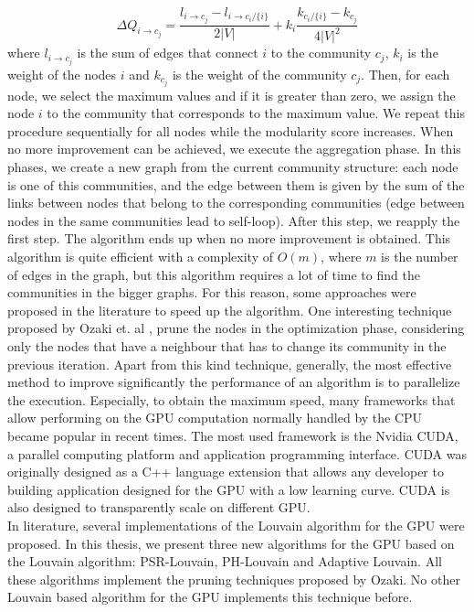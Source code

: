 \begin{equation}\label{intro_Delta}
\Delta Q_{i \rightarrow c_j} = \frac{l_{i\rightarrow c_j} - l_{i\rightarrow c_i / \{i\}}}{2|V|} + k_i \frac{k_{c_i / \{i\}} - k_{c_j}}{4|V|^2}
\end{equation}
where $l_{i\rightarrow c_j}$ is the sum of edges that connect $i$ to the community $c_j$, $k_i$ is the weight of the nodes $i$ and $k_{c_j}$ is the weight of the community $c_j$. Then, for each node, we select the maximum values and if it is greater than zero, we assign the node $i$ to the community that corresponds to the maximum value. We repeat this procedure sequentially for all nodes while the modularity score increases. When no more improvement can be achieved, we execute the aggregation phase. In this phases, we create a new graph from the current community structure: each node is one of this communities, and the edge between them is given by the sum of the links between nodes that belong to the corresponding communities (edge between nodes in the same communities lead to self-loop). After this step, we reapply the first step. The algorithm ends up when no more improvement is obtained.
This algorithm is quite efficient with a complexity of $O(m)$, where $m$ is the number of edges in the graph, but this algorithm requires a lot of time to find the communities in the bigger graphs. For this reason, some approaches were proposed in the literature to speed up the algorithm. One interesting technique proposed by Ozaki et. al \cite{pruning}, prune the nodes in the optimization phase, considering only the nodes that have a neighbour that has to change its community in the previous iteration. Apart from this kind technique, generally, the most effective method to improve significantly the performance of an algorithm is to parallelize the execution. Especially, to obtain the maximum speed, many frameworks that allow performing on the GPU computation normally handled by the CPU became popular in recent times. The most used framework is the Nvidia CUDA, a parallel computing platform and application programming interface. CUDA was originally designed as a C++ language extension that allows any developer to building application designed for the GPU with a low learning curve. CUDA is also designed to transparently scale on different GPU.\\
In literature, several implementations of the Louvain algorithm for the GPU were proposed. In this thesis, we present three new algorithms for the GPU based on the Louvain algorithm: PSR-Louvain, PH-Louvain and Adaptive Louvain. All these algorithms implement the pruning techniques proposed by Ozaki. No other Louvain based algorithm for the GPU implements this technique before. 
